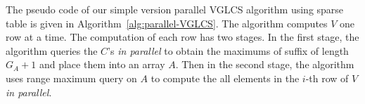 The pseudo code of our simple version parallel VGLCS algorithm using
sparse table is given in Algorithm~\ref{alg:parallel-VGLCS}.  The
algorithm computes $V$ one row at a time.  The computation of each row
has two stages.  In the first stage, the algorithm queries the $C$'s
{\em in parallel} to obtain the maximums of suffix of length $G_A + 1$
and place them into an array $A$.  Then in the second stage, the
algorithm uses range maximum query on $A$ to compute the all elements
in the $i$-th row of $V$ {\em in parallel}.





